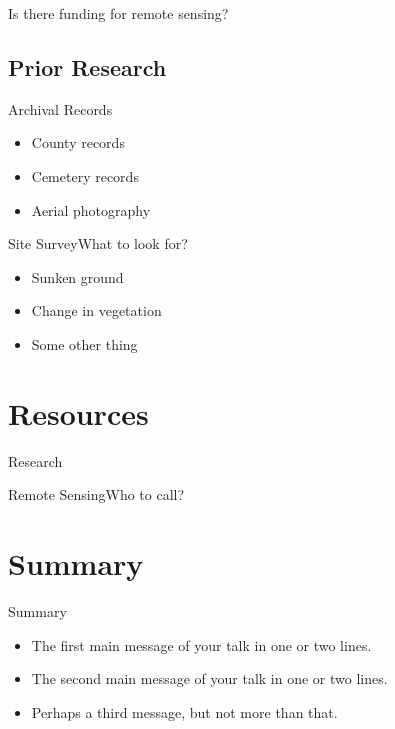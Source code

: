 \documentclass[11pt]{beamer}
\begin{document}
\begin{frame}{Is there funding for remote sensing?}

\end{frame}

\subsection{Prior Research}
\begin{frame}{Archival Records}
  \begin{itemize}
    \item County records
    \item Cemetery records
    \item Aerial photography
  \end{itemize}
\end{frame}

\begin{frame}{Site Survey}{What to look for?}
  \begin{itemize}
    \item Sunken ground
    \item Change in vegetation
    \item Some other thing
  \end{itemize}
\end{frame}


\section{Resources}
\begin{frame}{Research}

\end{frame}

\begin{frame}{Remote Sensing}{Who to call?}

\end{frame}


\section*{Summary}
\begin{frame}{Summary}

  \begin{itemize}
  \item
    The \alert{first main message} of your talk in one or two lines.
  \item
    The \alert{second main message} of your talk in one or two lines.
  \item
    Perhaps a \alert{third message}, but not more than that.
  \end{itemize}
\end{frame}
\end{document}
